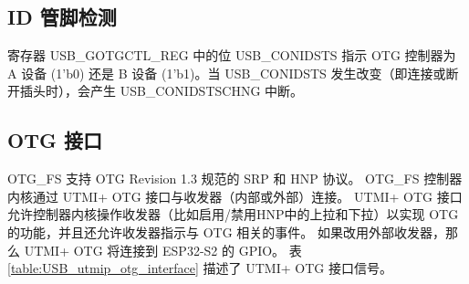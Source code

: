 \documentclass[main\_\_CN.tex]{subfiles}
\begin{document}
\subsection{ID 管脚检测}

寄存器 USB\_GOTGCTL\_REG 中的位 USB\_CONIDSTS 指示 OTG 控制器为 A 设备 (1'b0) 还是 B 设备 (1'b1)。当 USB\_CONIDSTS 发生改变（即连接或断开插头时），会产生 USB\_CONIDSTSCHNG 中断。

\subsection{OTG 接口}

OTG\_FS 支持 OTG Revision 1.3 规范的 SRP 和 HNP 协议。 OTG\_FS 控制器内核通过 UTMI+ OTG 接口与收发器（内部或外部）连接。 UTMI+ OTG 接口允许控制器内核操作收发器（比如启用/禁用HNP中的上拉和下拉）以实现 OTG 的功能，并且还允许收发器指示与 OTG 相关的事件。 如果改用外部收发器，那么 UTMI+ OTG 将连接到 ESP32-S2 的 GPIO。 表 \ref{table:USB_utmip_otg_interface} 描述了 UTMI+ OTG 接口信号。
\end{document}
